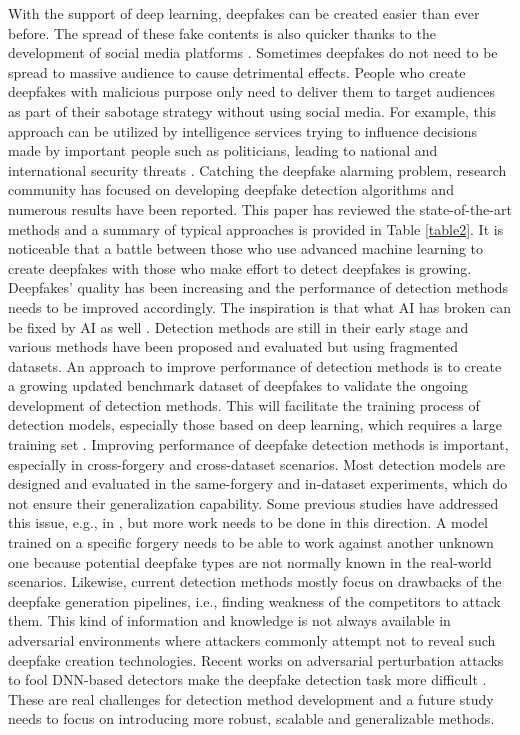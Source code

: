 \label{sec:4}
With the support of deep learning, deepfakes can be created easier than ever before. The spread of these fake contents is also quicker thanks to the development of social media platforms . Sometimes deepfakes do not need to be spread to massive audience to cause detrimental effects. People who create deepfakes with malicious purpose only need to deliver them to target audiences as part of their sabotage strategy without using social media. For example, this approach can be utilized by intelligence services trying to influence decisions made by important people such as politicians, leading to national and international security threats . Catching the deepfake alarming problem, research community has focused on developing deepfake detection algorithms and numerous results have been reported. This paper has reviewed the state-of-the-art methods and a summary of typical approaches is provided in Table \ref{table2}. It is noticeable that a battle between those who use advanced machine learning to create deepfakes with those who make effort to detect deepfakes is growing.
Deepfakes' quality has been increasing and the performance of detection methods needs to be improved accordingly. The inspiration is that what AI has broken can be fixed by AI as well . Detection methods are still in their early stage and various methods have been proposed and evaluated but using fragmented datasets. An approach to improve performance of detection methods is to create a growing updated benchmark dataset of deepfakes to validate the ongoing development of detection methods. This will facilitate the training process of detection models, especially those based on deep learning, which requires a large training set . 
Improving performance of deepfake detection methods is important, especially in cross-forgery and cross-dataset scenarios. Most detection models are designed and evaluated in the same-forgery and in-dataset experiments, which do not ensure their generalization capability. Some previous studies have addressed this issue, e.g., in , but more work needs to be done in this direction. A model trained on a specific forgery needs to be able to work against another unknown one because potential deepfake types are not normally known in the real-world scenarios. Likewise, current detection methods mostly focus on drawbacks of the deepfake generation pipelines, i.e., finding weakness of the competitors to attack them. This kind of information and knowledge is not always available in adversarial environments where attackers commonly attempt not to reveal such deepfake creation technologies. Recent works on adversarial perturbation attacks to fool DNN-based detectors make the deepfake detection task more difficult . These are real challenges for detection method development and a future study needs to focus on introducing more robust, scalable and generalizable methods.

